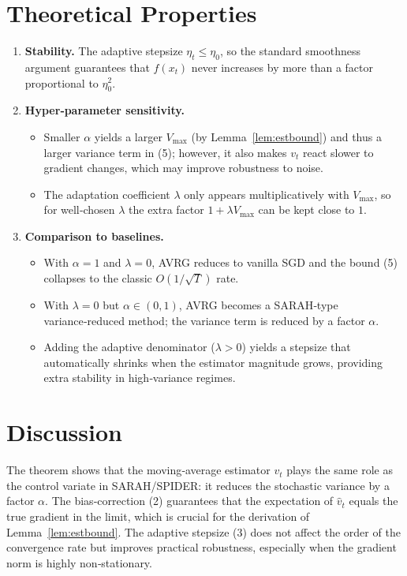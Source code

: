 \documentclass{article}
\begin{document}
\section*{Theoretical Properties}
\begin{enumerate}
\item \textbf{Stability.} The adaptive stepsize $\eta_{t}\le\eta_{0}$, so the
standard smoothness argument guarantees that $f(x_{t})$ never increases
by more than a factor proportional to $\eta_{0}^{2}$.
\item \textbf{Hyper‑parameter sensitivity.}
\begin{itemize}
\item Smaller $\alpha$ yields a larger $V_{\max}$ (by Lemma~\ref{lem:estbound})
and thus a larger variance term in (5); however, it also makes $v_{t}$ react
slower to gradient changes, which may improve robustness to noise.
\item The adaptation coefficient $\lambda$ only appears multiplicatively
with $V_{\max}$, so for well‑chosen $\lambda$ the extra factor
$1+\lambda V_{\max}$ can be kept close to $1$.
\end{itemize}
\item \textbf{Comparison to baselines.}
\begin{itemize}
\item With $\alpha=1$ and $\lambda=0$, AVRG reduces to vanilla SGD and
the bound (5) collapses to the classic $O(1/\sqrt{T})$ rate.
\item With $\lambda=0$ but $\alpha\in(0,1)$, AVRG becomes a SARAH‑type
variance‑reduced method; the variance term is reduced by a factor $\alpha$.
\item Adding the adaptive denominator ($\lambda>0$) yields a stepsize that
automatically shrinks when the estimator magnitude grows, providing extra
stability in high‑variance regimes.
\end{itemize}
\end{enumerate}

\section*{Discussion}
The theorem shows that the moving‑average estimator $v_{t}$ plays the same
role as the control variate in SARAH/SPIDER: it reduces the stochastic
variance by a factor $\alpha$. The bias‑correction (2) guarantees that the
expectation of $\hat v_{t}$ equals the true gradient in the limit, which is
crucial for the derivation of Lemma~\ref{lem:estbound}. The adaptive stepsize
(3) does not affect the order of the convergence rate but improves practical
robustness, especially when the gradient norm is highly non‑stationary.
\end{document}
